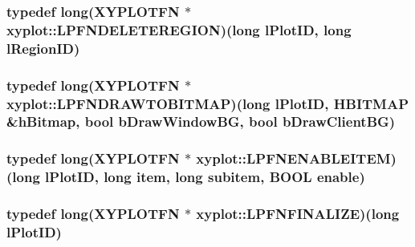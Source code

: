 \hypertarget{namespacexyplot_ad184f4d62ca85e471cef796c79dd0b4c}{
\subsubsection[{L\-P\-F\-N\-D\-E\-L\-E\-T\-E\-R\-E\-G\-I\-O\-N}]{\setlength{\rightskip}{0pt plus 5cm}typedef {\bf long}({\bf X\-Y\-P\-L\-O\-T\-F\-N} $\ast$ xyplot\-::\-L\-P\-F\-N\-D\-E\-L\-E\-T\-E\-R\-E\-G\-I\-O\-N)({\bf long} l\-Plot\-I\-D, {\bf long} l\-Region\-I\-D)}}\label{namespacexyplot_ad184f4d62ca85e471cef796c79dd0b4c}
\hypertarget{namespacexyplot_abe5bcbe4527096dba3cee83119449785}{
\subsubsection[{L\-P\-F\-N\-D\-R\-A\-W\-T\-O\-B\-I\-T\-M\-A\-P}]{\setlength{\rightskip}{0pt plus 5cm}typedef {\bf long}({\bf X\-Y\-P\-L\-O\-T\-F\-N} $\ast$ xyplot\-::\-L\-P\-F\-N\-D\-R\-A\-W\-T\-O\-B\-I\-T\-M\-A\-P)({\bf long} l\-Plot\-I\-D, H\-B\-I\-T\-M\-A\-P \&h\-Bitmap, bool b\-Draw\-Window\-B\-G, bool b\-Draw\-Client\-B\-G)}}\label{namespacexyplot_abe5bcbe4527096dba3cee83119449785}
\hypertarget{namespacexyplot_adc713064c472b328718bae52d4a28eb5}{
\subsubsection[{L\-P\-F\-N\-E\-N\-A\-B\-L\-E\-I\-T\-E\-M}]{\setlength{\rightskip}{0pt plus 5cm}typedef {\bf long}({\bf X\-Y\-P\-L\-O\-T\-F\-N} $\ast$ xyplot\-::\-L\-P\-F\-N\-E\-N\-A\-B\-L\-E\-I\-T\-E\-M)({\bf long} l\-Plot\-I\-D, {\bf long} item, {\bf long} subitem, B\-O\-O\-L enable)}}\label{namespacexyplot_adc713064c472b328718bae52d4a28eb5}
\hypertarget{namespacexyplot_a0c97b982a01a1c43f6900a274d295b11}{
\subsubsection[{L\-P\-F\-N\-F\-I\-N\-A\-L\-I\-Z\-E}]{\setlength{\rightskip}{0pt plus 5cm}typedef {\bf long}({\bf X\-Y\-P\-L\-O\-T\-F\-N} $\ast$ xyplot\-::\-L\-P\-F\-N\-F\-I\-N\-A\-L\-I\-Z\-E)({\bf long} l\-Plot\-I\-D)}}\label{namespacexyplot_a0c97b982a01a1c43f6900a274d295b11}
